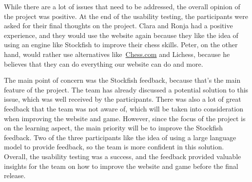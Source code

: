 While there are a lot of issues that need to be addressed, the overall opinion of the project was positive.
At the end of the usability testing, the participants were asked for their final thoughts on the project.
Clara and Ronja had a positive experience, and they would use the website again because they like the idea of using an
engine like Stockfish to improve their chess skills.
Peter, on the other hand, would rather use alternatives like~\url{Chess.com} and Lichess, because he believes that they
can do everything our website can do and more.

The main point of concern was the Stockfish feedback, because that's the main feature of the project.
The team has already discussed a potential solution to this issue, which was well received by the participants.
There was also a lot of great feedback that the team was not aware of, which will be taken into consideration when
improving the website and game.
However, since the focus of the project is on the learning aspect, the main priority will be to improve the Stockfish
feedback.
Two of the three participants like the idea of using a large language model to provide feedback, so the team is more
confident in this solution.
Overall, the usability testing was a success, and the feedback provided valuable insights for the team on how to improve
the website and game before the final release.
